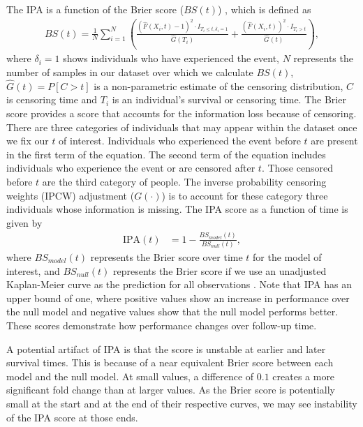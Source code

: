 \documentclass[AMA,STIX1COL,]{WileyNJD-v2}
\begin{document}
The IPA is a function of the Brier score (\(BS(t)\)) \citep{graf1999},
which is defined as \begin{align}
BS(t)=\frac{1}{N}\sum^{N}_{i=1}\left(\frac{\left(\widehat{F}(X_{i},t)-1\right)^{2}\cdot I_{T_{i}\leq t,\delta_{i}=1}}{\widehat{G}(T_{i})} + \frac{\left(\widehat{F}(X_{i},t)\right)^{2}\cdot I_{T_{i}>t}}{\widehat{G}(t)}\right),
\end{align} where \(\delta_{i}=1\) shows individuals who have
experienced the event, \(N\) represents the number of samples in our
dataset over which we calculate \(BS(t)\), \(\widehat{G}(t)=P[C>t]\) is
a non-parametric estimate of the censoring distribution, \(C\) is
censoring time and \(T_{i}\) is an individual's survival or censoring
time. The Brier score provides a score that accounts for the information
loss because of censoring. There are three categories of individuals
that may appear within the dataset once we fix our \(t\) of interest.
Individuals who experienced the event before \(t\) are present in the
first term of the equation. The second term of the equation includes
individuals who experience the event or are censored after \(t\). Those
censored before \(t\) are the third category of people. The inverse
probability censoring weights (IPCW) adjustment (\(G(\cdot)\)) is to
account for these category three individuals whose information is
missing. The IPA score as a function of time is given by \begin{align}
\textrm{IPA}(t) &= 1-\frac{BS_{model}(t)}{BS_{null}(t)}, \nonumber
\end{align} where \(BS_{model}(t)\) represents the Brier score over time
\(t\) for the model of interest, and \(BS_{null}(t)\) represents the
Brier score if we use an unadjusted Kaplan-Meier curve as the prediction
for all observations \citep{kattan2018index}. Note that IPA has an upper
bound of one, where positive values show an increase in performance over
the null model and negative values show that the null model performs
better. These scores demonstrate how performance changes over follow-up
time.

A potential artifact of IPA is that the score is unstable at earlier and
later survival times. This is because of a near equivalent Brier score
between each model and the null model. At small values, a difference of
\(0.1\) creates a more significant fold change than at larger values. As
the Brier score is potentially small at the start and at the end of
their respective curves, we may see instability of the IPA score at
those ends.
\end{document}

